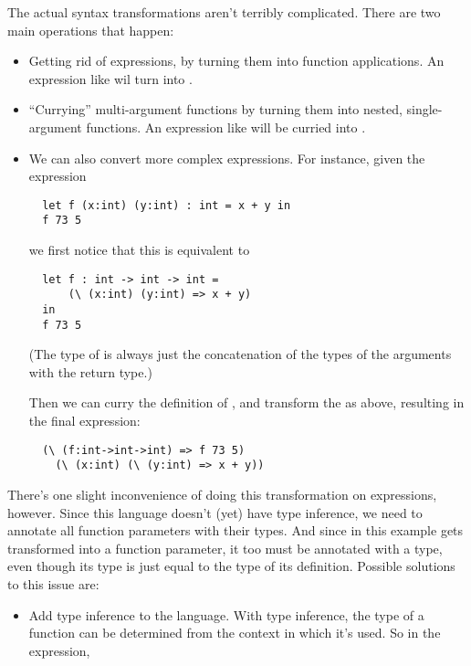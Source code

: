 \documentclass[pageno]{jpaper}
\begin{document}
{{{The actual syntax transformations aren't terribly complicated.
There are two main operations that happen:
\begin{itemize}
\item Getting rid of  expressions, by turning them into function applications.
An expression like  wil turn into .
\item ``Currying'' multi-argument functions by turning them into nested, single-argument functions.
An expression like  will be curried into
.
\item We can also convert more complex  expressions.
For instance, given the expression 

\begin{lstlisting}
  let f (x:int) (y:int) : int = x + y in
  f 73 5 
\end{lstlisting}
 
we first notice that this is equivalent to

\begin{lstlisting}
  let f : int -> int -> int =
      (\ (x:int) (y:int) => x + y)
  in
  f 73 5
\end{lstlisting}

(The type of  is always just the concatenation of the types of the arguments with the return type.)

Then we can curry the definition of , and transform the  as above, resulting in
the final expression:

\begin{lstlisting}
  (\ (f:int->int->int) => f 73 5)
    (\ (x:int) (\ (y:int) => x + y))
\end{lstlisting}
\end{itemize}

There's one slight inconvenience of doing this transformation on  expressions, however.
Since this language doesn't (yet) have type inference, we need to annotate all function parameters
with their types. And since  in this example gets transformed into a function parameter,
it too must be annotated with a type, even though its type is just equal to the type of its definition.
Possible solutions to this issue are:

\begin{itemize}
\item Add type inference to the language. With type inference, the type of a function
can be determined from the context in which it's used. So in the expression,


\end{itemize}}}}
\end{document}
